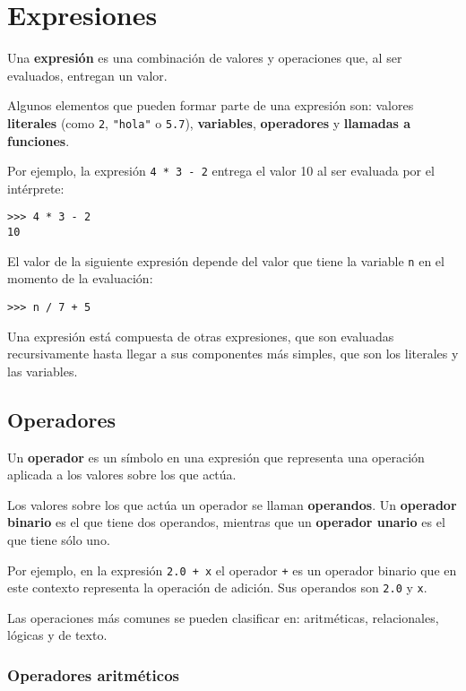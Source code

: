 \chapter{Expresiones}

Una \textbf{expresión} es una combinación de valores y operaciones que,
al ser evaluados, entregan un valor.

Algunos elementos que pueden formar parte de una expresión son: valores
\textbf{literales} (como \lstinline!2!, \lstinline!"hola"! o
\lstinline!5.7!), \textbf{variables}, \textbf{operadores} y
\textbf{llamadas a funciones}.

Por ejemplo, la expresión \lstinline!4 * 3 - 2! entrega el valor 10 al
ser evaluada por el intérprete:

\begin{lstlisting}
>>> 4 * 3 - 2
10
\end{lstlisting}

El valor de la siguiente expresión depende del valor que tiene la
variable \lstinline!n! en el momento de la evaluación:

\begin{lstlisting}
>>> n / 7 + 5
\end{lstlisting}

Una expresión está compuesta de otras expresiones, que son evaluadas
recursivamente hasta llegar a sus componentes más simples, que son los
literales y las variables.

\section{Operadores}

Un \textbf{operador} es un símbolo en una expresión que representa una
operación aplicada a los valores sobre los que actúa.

Los valores sobre los que actúa un operador se llaman
\textbf{operandos}. Un \textbf{operador binario} es el que tiene dos
operandos, mientras que un \textbf{operador unario} es el que tiene sólo
uno.

Por ejemplo, en la expresión \lstinline!2.0 + x! el operador
\lstinline!+! es un operador binario que en este contexto representa la
operación de adición. Sus operandos son \lstinline!2.0! y \lstinline!x!.

Las operaciones más comunes se pueden clasificar en: aritméticas,
relacionales, lógicas y de texto.

\subsection{Operadores aritméticos}

